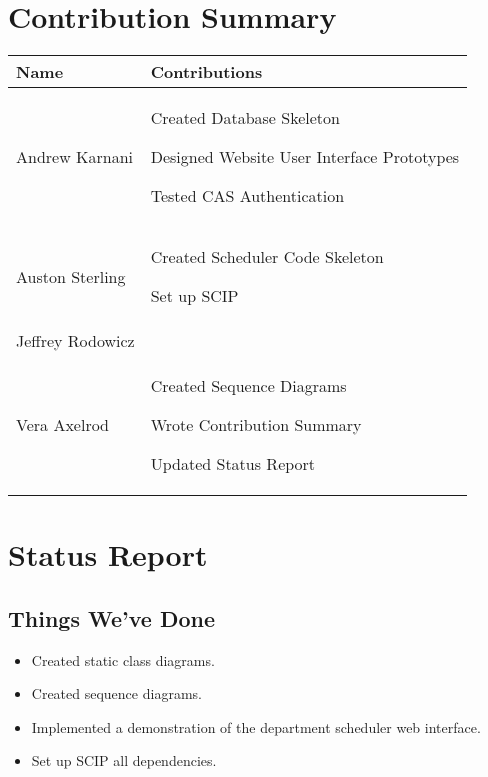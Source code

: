\documentclass[11pt]{article}
\newenvironment{packed_itemize}{
\begin{itemize}
  \setlength{\itemsep}{1pt}
  \setlength{\parskip}{0pt}
  \setlength{\parsep}{0pt}
}{\end{itemize}}
\begin{document}
\section{Contribution Summary}
\begin{tabular}{|m{1.4in}|m{4in}|}
\hline
\textbf{\large Name}     & \textbf{\large Contributions} \\
\hline\hline

 Andrew Karnani
	&
	 \begin{packed_itemize}
		\item Created Database Skeleton
		\item Designed Website User Interface Prototypes
		\item Tested CAS Authentication
	\end{packed_itemize}
\\
\hline
 Auston Sterling
	&
	 \begin{packed_itemize}
	        \item Created Scheduler Code Skeleton
		  \item Set up SCIP
	\end{packed_itemize}
\\
\hline
Jeffrey Rodowicz
	&
	 \begin{packed_itemize}
		\item 
	\end{packed_itemize}
\\
\hline
Vera Axelrod
	&
	 \begin{packed_itemize}
		\item Created Sequence Diagrams
		\item Wrote Contribution Summary
		\item Updated Status Report
	\end{packed_itemize}
\\
\hline
\end{tabular}

\section*{Status Report}
\subsection{Things We've Done}
\begin{itemize}
	\item Created static class diagrams.
	\item Created sequence diagrams.
	\item Implemented a demonstration of the department scheduler web interface.
	\item Set up SCIP  all dependencies.
\end{itemize}
\end{document}
